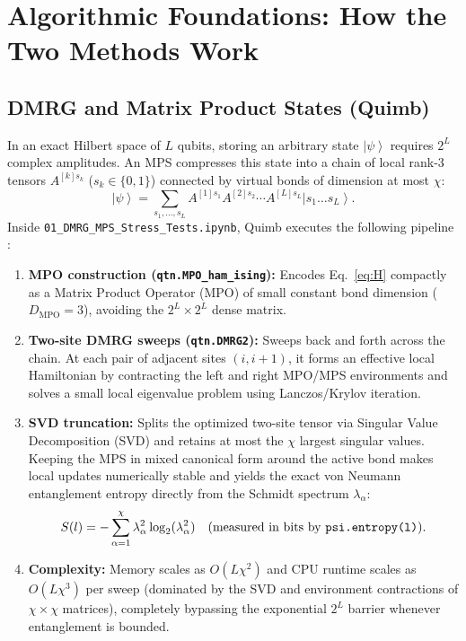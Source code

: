 \documentclass[11pt,a4paper]{article}
\providecommand{\ket}[1]{\left|#1\right\rangle}
\begin{document}
\section{Algorithmic Foundations: How the Two Methods Work}
\subsection{DMRG and Matrix Product States (Quimb)}
In an exact Hilbert space of $L$ qubits, storing an arbitrary state $\ket{\psi}$ requires $2^L$ complex amplitudes. An MPS compresses this state into a chain of local rank-3 tensors $A^{[k]s_k}$ ($s_k \in \{0,1\}$) connected by virtual bonds of dimension at most $\chi$:
\begin{equation}
\ket{\psi} = \sum_{s_1,\dots,s_L} A^{[1]s_1} A^{[2]s_2} \cdots A^{[L]s_L} \ket{s_1 \dots s_L}.
\end{equation}
Inside \texttt{01\_DMRG\_MPS\_Stress\_Tests.ipynb}, Quimb executes the following pipeline \cite{QuimbDMRG,Quimb1D}:
\begin{enumerate}[leftmargin=*]
\item \textbf{MPO construction (\texttt{qtn.MPO\_ham\_ising}):} Encodes Eq.~\eqref{eq:H} compactly as a Matrix Product Operator (MPO) of small constant bond dimension ($D_{\mathrm{MPO}} = 3$), avoiding the $2^L \times 2^L$ dense matrix.
\item \textbf{Two-site DMRG sweeps (\texttt{qtn.DMRG2}):} Sweeps back and forth across the chain. At each pair of adjacent sites $(i, i+1)$, it forms an effective local Hamiltonian by contracting the left and right MPO/MPS environments and solves a small local eigenvalue problem using Lanczos/Krylov iteration.
\item \textbf{SVD truncation:} Splits the optimized two-site tensor via Singular Value Decomposition (SVD) and retains at most the $\chi$ largest singular values. Keeping the MPS in mixed canonical form around the active bond makes local updates numerically stable and yields the exact von Neumann entanglement entropy directly from the Schmidt spectrum $\lambda_\alpha$:
\begin{equation}
S(l) = -\sum_{\alpha=1}^{\chi} \lambda_\alpha^2 \log_2(\lambda_\alpha^2) \quad \text{(measured in bits by \texttt{psi.entropy(l)})}.
\end{equation}
\item \textbf{Complexity:} Memory scales as $O(L \chi^2)$ and CPU runtime scales as $O(L \chi^3)$ per sweep (dominated by the SVD and environment contractions of $\chi \times \chi$ matrices), completely bypassing the exponential $2^L$ barrier whenever entanglement is bounded.
\end{enumerate}
\end{document}
